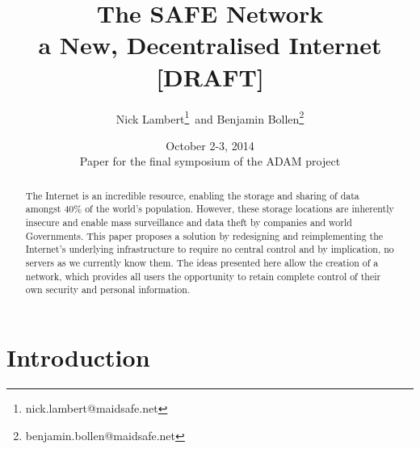 \documentclass[twocolumn,english]{article}
\begin{document}
\title{The SAFE Network\\ a New, Decentralised Internet [DRAFT]}
\date{October 2-3, 2014\\ Paper for the final symposium of the ADAM project}
\author{Nick Lambert\footnote{nick.lambert@maidsafe.net}\, and Benjamin Bollen\footnote{benjamin.bollen@maidsafe.net}}
\maketitle

\begin{abstract}
The Internet is an incredible resource, enabling the storage and sharing
of data amongst 40\% of the world\textquoteright s population. However,
these storage locations are inherently insecure and enable mass surveillance
and data theft by companies and world Governments. This paper proposes
a solution by redesigning and reimplementing the Internet\textquoteright s
underlying infrastructure to require no central control and by implication,
no servers as we currently know them. The ideas presented here allow
the creation of a network, which provides all users the opportunity
to retain complete control of their own security and personal information.
\end{abstract}

\section{Introduction}
\end{document}
